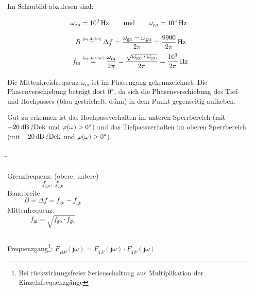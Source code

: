 \begin{frame}
{    Im Schaubild abzulesen sind:
    \begin{align}
        \omega_{\mathrm{gu}} &= 10^2\operatorname{Hz} \qquad \text{und} \qquad
            \omega_{\mathrm{go}} = 10^4\operatorname{Hz}\vphantom{\bigg|}\\
        B &\overset{\tiny\ref{eq:def:b}}{=} \Delta f = \frac{\omega_{\mathrm{go}} - \omega_{\mathrm{gu}}}{2\pi}
            = \frac{9900}{2\pi}\operatorname{Hz}\vphantom{\bigg|}\\
        f_{\mathrm{m}} &\overset{\tiny\ref{eq:def:fm}}{=} \frac{\omega_{\mathrm{m}}}{2\pi} 
            = \frac{\sqrt{\omega_{\mathrm{go}} \cdot \omega_{\mathrm{gu}}}}{2\pi} = \frac{10^3}{2\pi}\operatorname{Hz}\vphantom{\bigg|}
    \end{align}
    
    Die Mittenkreisfrequenz $\omega_{\mathrm{m}}$ ist im Phasengang gekennzeichnet.
    Die Phasenverschiebung beträgt dort $0\degree$, da sich die Phasenverschiebung des Tief- und Hochpasses
    (blau gestrichelt, dünn) in dem Punkt gegenseitig aufheben.

    Gut zu erkennen ist das Hochpassverhalten im unteren Sperrbereich (mit $+20\operatorname{dB}/\mathrm{Dek}$ und $\varphi(\omega) > 0\degree$)
    und das Tiefpassverhalten im oberen Sperrbereich (mit $-20\operatorname{dB}/\mathrm{Dek}$ und $\varphi(\omega) > 0\degree$).

}
\b{
    \begin{columns}[c]
        \centering%
            \hfill%

        \centering%
            \flushleft
            Grenzfrequenz: (obere, untere)
                \begin{equation}f_{\mathrm{go}},\ f_{\mathrm{gu}} \end{equation}
            Bandbreite:
                \begin{equation}B = \Delta f = f_{\mathrm{go}} - f_{\mathrm{gu}}\end{equation}
            Mittenfrequenz:
                \begin{equation}f_{\mathrm{m}} = \sqrt{f_{\mathrm{go}} \cdot f_{\mathrm{gu}}}\end{equation}
    \end{columns}
    Frequenzgang\footnote{Bei rückwirkungsfreier Serienschaltung aus Multiplikation der Einzelnfrequenzgänge}:%
    $\underline{F}_{BP}(\mathrm{j}\omega)=\underline{F}_{TP}(\mathrm{j}\omega)\cdot\underline{F}_{TP}(\mathrm{j}\omega)$%
}
\end{frame}

